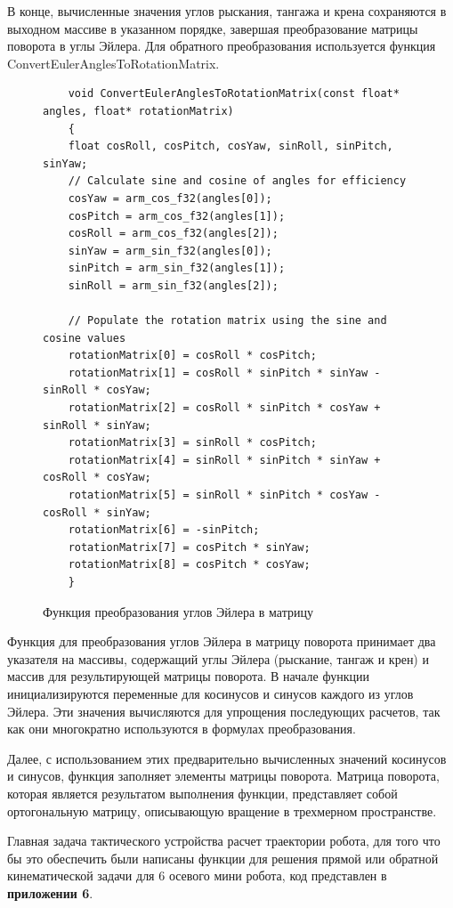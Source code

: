 В конце, вычисленные значения углов рыскания, тангажа и крена сохраняются в выходном массиве в указанном порядке, завершая преобразование матрицы поворота в углы Эйлера. Для обратного преобразования используется функция ConvertEulerAnglesToRotationMatrix.
\begin{figure}[H]
	\centering
	\begin{verbatim}
    void ConvertEulerAnglesToRotationMatrix(const float* angles, float* rotationMatrix)
    {
    float cosRoll, cosPitch, cosYaw, sinRoll, sinPitch, sinYaw;
    // Calculate sine and cosine of angles for efficiency
    cosYaw = arm_cos_f32(angles[0]);
    cosPitch = arm_cos_f32(angles[1]);
    cosRoll = arm_cos_f32(angles[2]);
    sinYaw = arm_sin_f32(angles[0]);
    sinPitch = arm_sin_f32(angles[1]);
    sinRoll = arm_sin_f32(angles[2]);

    // Populate the rotation matrix using the sine and cosine values
    rotationMatrix[0] = cosRoll * cosPitch;
    rotationMatrix[1] = cosRoll * sinPitch * sinYaw - sinRoll * cosYaw;
    rotationMatrix[2] = cosRoll * sinPitch * cosYaw + sinRoll * sinYaw;
    rotationMatrix[3] = sinRoll * cosPitch;
    rotationMatrix[4] = sinRoll * sinPitch * sinYaw + cosRoll * cosYaw;
    rotationMatrix[5] = sinRoll * sinPitch * cosYaw - cosRoll * sinYaw;
    rotationMatrix[6] = -sinPitch;
    rotationMatrix[7] = cosPitch * sinYaw;
    rotationMatrix[8] = cosPitch * cosYaw;
    }
	\end{verbatim}
	\caption{Функция преобразования углов Эйлера в матрицу}\label{codeConvertEulerAnglesToRotationMatrix}
\end{figure}

Функция для преобразования углов Эйлера в матрицу поворота принимает два указателя на массивы, содержащий углы Эйлера (рыскание, тангаж и крен) и массив для результирующей матрицы поворота. В начале функции инициализируются переменные для косинусов и синусов каждого из углов Эйлера. Эти значения вычисляются для упрощения последующих расчетов, так как они многократно используются в формулах преобразования.

Далее, с использованием этих предварительно вычисленных значений косинусов и синусов, функция заполняет элементы матрицы поворота. Матрица поворота, которая является результатом выполнения функции, представляет собой ортогональную матрицу, описывающую вращение в трехмерном пространстве. 

Главная задача тактического устройства расчет траектории робота, для того что бы это обеспечить были написаны функции для решения прямой или обратной кинематической задачи для 6 осевого мини робота, код представлен в \textbf{приложении 6}. 

